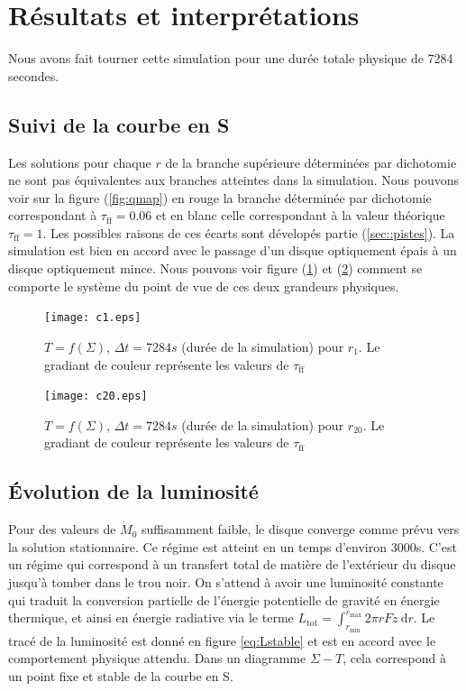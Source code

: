 \section{Résultats et interprétations}

Nous avons fait tourner cette simulation pour une durée totale physique de 7284 secondes.

\subsection{Suivi de la courbe en S}
Les solutions pour chaque $r$ de la branche supérieure déterminées par dichotomie ne sont pas équivalentes aux branches atteintes dans la simulation. Nous pouvons voir sur la figure (\ref{fig:qmap}) en rouge la branche déterminée par dichotomie correspondant à $\tau_\mathrm{ff} = 0.06 $ et en blanc celle correspondant à la valeur théorique $\tau_\mathrm{ff} = 1$. Les possibles raisons de ces écarts sont dévelopés partie (\ref{sec::pistes}). La simulation est bien en accord avec le passage d'un disque optiquement épais à un disque optiquement mince. Nous pouvons voir figure (\ref{fig:c1.eps}) et (\ref{fig:c20.eps}) comment se comporte le système du point de vue de ces deux grandeurs physiques. 
 

\begin{figure}
  \begin{center}
    \texttt{[image: c1.eps]}
  \end{center}
  \caption{$T=f(\Sigma)$, $\Delta t = 7284 s$ (durée de la simulation) pour $r_{1}$. Le gradiant de couleur représente les valeurs de $\tau_\mathrm{ff}$}
  \label{fig:c1.eps}
\end{figure} 

\begin{figure}
  \begin{center}
    \texttt{[image: c20.eps]}
  \end{center}
  \caption{$T=f(\Sigma)$, $\Delta t = 7284 s$ (durée de la simulation) pour $r_{20}$. Le gradiant de couleur représente les valeurs de $\tau_\mathrm{ff}$}
  \label{fig:c20.eps}
\end{figure}

\subsection{Évolution de la luminosité}

Pour des valeurs de $\dot{M}_0$ suffisamment faible, le disque converge comme prévu vers la solution stationnaire. Ce régime est atteint en un temps d'environ 3000s. C'est un régime qui correspond à un transfert total de matière de l'extérieur du disque jusqu'à tomber dans le trou noir. On s'attend à avoir une luminosité constante qui traduit la conversion partielle de l'énergie potentielle de gravité en énergie thermique, et ainsi en énergie radiative via le terme $L_\mathrm{tot} = \int_{r_\mathrm{min}}^{r_\mathrm{max}} 2\pi r Fz\ \mathrm{d}r$. Le tracé de la luminosité est donné en figure \ref{eq:Lstable} et est en accord avec le comportement physique attendu. Dans un diagramme $\Sigma-T$, cela correspond à un point fixe et stable de la courbe en S.

